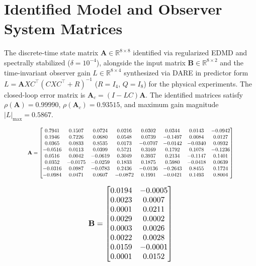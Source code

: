 \documentclass[asi,article,accept,pdftex,moreauthors]{Definitions/mdpi}
\begin{document}
\appendixstart
\appendix

\section{Identified Model and Observer System Matrices}
\label{app:matrices}

{%
The discrete-time state matrix $\mathbf{A} \in \mathbb{R}^{8 \times 8}$ identified via regularized EDMD and spectrally stabilized ($\delta = 10^{-4}$), alongside the input matrix $\mathbf{B} \in \mathbb{R}^{8 \times 2}$ and the time-invariant observer gain $L \in \mathbb{R}^{8 \times 4}$ synthesized via DARE in predictor form $L=\mathbf AXC^\top(CXC^\top+R)^{-1}$ ($R=I_4$, $Q=I_8$) for the physical experiments. The closed-loop error matrix is $\mathbf A_c=(I-LC)\mathbf A$. The identified matrices satisfy $\rho(\mathbf{A})=0.99990$, $\rho(\mathbf A_c)=0.93515$, and maximum gain magnitude $|L|_{\max} = 0.5867$.

\vspace{0.4cm}
\begin{equation}
\resizebox{0.85\linewidth}{!}{$
\mathbf{A} = \begin{bmatrix}
  0.7941 & 0.1507 & 0.0724 & 0.0216 & 0.0302 & 0.0344 & 0.0143 & -0.0942 \\
  0.1946 & 0.7226 & 0.0680 & 0.0548 & 0.0739 & -0.1497 & 0.0084 & 0.0127 \\
  0.0365 & 0.0833 & 0.8535 & 0.0173 & -0.0707 & -0.0142 & -0.0340 & 0.0932 \\
  -0.0516 & 0.0113 & 0.0399 & 0.5721 & 0.3169 & 0.1792 & 0.1078 & -0.1236 \\
  0.0516 & 0.0042 & -0.0619 & 0.3049 & 0.3937 & 0.2134 & -0.1147 & 0.1401 \\
  0.0352 & -0.0175 & -0.0259 & 0.1833 & 0.1875 & 0.5980 & -0.0418 & 0.0639 \\
  -0.0316 & 0.0987 & -0.0783 & 0.2436 & -0.0136 & -0.2643 & 0.8455 & 0.1724 \\
  -0.0984 & 0.0471 & 0.0607 & -0.0872 & 0.1991 & -0.0421 & 0.1493 & 0.8004
\end{bmatrix}
$}
\end{equation}

\vspace{0.2cm}
\begin{equation}
\resizebox{0.35\linewidth}{!}{$
\mathbf{B} = \begin{bmatrix}
  0.0194 & -0.0005 \\
  0.0023 & 0.0007 \\
  0.0001 & 0.0211 \\
  0.0029 & 0.0002 \\
  0.0003 & 0.0026 \\
  0.0022 & 0.0028 \\
  0.0159 & -0.0001 \\
  0.0001 & 0.0152
\end{bmatrix}
$}
\end{equation}

}
\end{document}
